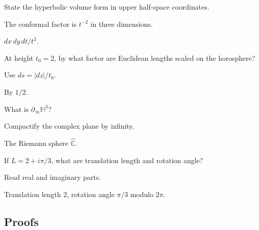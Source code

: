 \begin{exercise}\label{exr:vii36-ped-02}
State the hyperbolic volume form in upper half-space coordinates.
\end{exercise}

\begin{hint}
The conformal factor is \(t^{-2}\) in three dimensions.
\end{hint}

\begin{solution}
\(dx\,dy\,dt/t^3\).
\end{solution}

\begin{exercise}\label{exr:vii36-ped-03}
At height \(t_0=2\), by what factor are Euclidean lengths scaled on the horosphere?
\end{exercise}

\begin{hint}
Use \(ds=|dz|/t_0\).
\end{hint}

\begin{solution}
By \(1/2\).
\end{solution}

\begin{exercise}[Boundary]\label{exr:vii36-ped-04}
What is \(\partial_\infty\mathbb H^3\)?
\end{exercise}

\begin{hint}
Compactify the complex plane by infinity.
\end{hint}

\begin{solution}
The Riemann sphere \(\widehat{\mathbb C}\).
\end{solution}

\begin{exercise}\label{exr:vii36-ped-05}
If \(L=2+i\pi/3\), what are translation length and rotation angle?
\end{exercise}

\begin{hint}
Read real and imaginary parts.
\end{hint}

\begin{solution}
Translation length \(2\), rotation angle \(\pi/3\) modulo \(2\pi\).
\end{solution}

\subsection*{Proofs}


